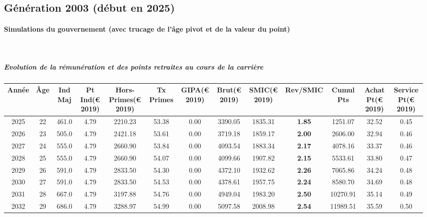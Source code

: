 \newpage 
 
\subsection{Génération 2003 (début en 2025)} 

\paragraph{Simulations du gouvernement (avec trucage de l'âge pivot et de la valeur du point)}  ~\\ 
 
\subparagraph{Evolution de la rémunération et des points retraites au cours de la carrière} 
 
{ \scriptsize \begin{center} 
\begin{tabular}[htb]{|c|c||c|c|c|c|c|c||c|c||c|c|c||} 
\hline 
 Année &  Âge &  Ind Maj &  Pt Ind(\euro{} 2019) &   Hors-Primes(\euro{} 2019) &  Tx Primes &  GIPA(\euro{} 2019) &  Brut(\euro{} 2019) &  SMIC(\euro{} 2019) &  Rev/SMIC &  Cumul Pts &  Achat Pt(\euro{} 2019) &  Service Pt(\euro{} 2019) \\ 
\hline \hline 
 2025 &  22 &  461.0 &  4.79 &  2210.23 &  53.38 &  0.00 &  3390.05 &  1835.31 &  {\bf 1.85} &  1251.07 &  32.52 &  0.45 \\ 
\hline 
 2026 &  23 &  505.0 &  4.79 &  2421.18 &  53.61 &  0.00 &  3719.18 &  1859.17 &  {\bf 2.00} &  2606.00 &  32.94 &  0.46 \\ 
\hline 
 2027 &  24 &  555.0 &  4.79 &  2660.90 &  53.84 &  0.00 &  4093.54 &  1883.34 &  {\bf 2.17} &  4078.16 &  33.37 &  0.46 \\ 
\hline 
 2028 &  25 &  555.0 &  4.79 &  2660.90 &  54.07 &  0.00 &  4099.66 &  1907.82 &  {\bf 2.15} &  5533.61 &  33.80 &  0.47 \\ 
\hline 
 2029 &  26 &  591.0 &  4.79 &  2833.50 &  54.30 &  0.00 &  4372.10 &  1932.62 &  {\bf 2.26} &  7065.86 &  34.24 &  0.48 \\ 
\hline 
 2030 &  27 &  591.0 &  4.79 &  2833.50 &  54.53 &  0.00 &  4378.61 &  1957.75 &  {\bf 2.24} &  8580.70 &  34.69 &  0.48 \\ 
\hline 
 2031 &  28 &  667.0 &  4.79 &  3197.88 &  54.76 &  0.00 &  4949.04 &  1983.20 &  {\bf 2.50} &  10270.91 &  35.14 &  0.49 \\ 
\hline 
 2032 &  29 &  686.0 &  4.79 &  3288.97 &  54.99 &  0.00 &  5097.58 &  2008.98 &  {\bf 2.54} &  11989.51 &  35.59 &  0.50 \\ 

\end{tabular}
\end{center}}
